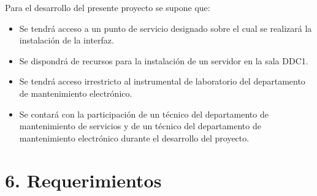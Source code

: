 \documentclass[
11pt%
]{charter}
\begin{document}
Para el desarrollo del presente proyecto se supone que:

\begin{itemize}
	\item Se tendrá acceso a un punto de servicio designado sobre el cual se realizará la instalación de la interfaz.
	\item Se dispondrá de recursos para la instalación de un servidor en la sala DDC1.
	\item Se tendrá acceso irrestricto al instrumental de laboratorio del departamento de mantenimiento electrónico.
	\item Se contará con la participación de un técnico del departamento de mantenimiento de servicios y de un técnico del departamento de mantenimiento electrónico durante el desarrollo del proyecto.
\end{itemize}



\section{6. Requerimientos}
\label{sec:requerimientos}
\end{document}
